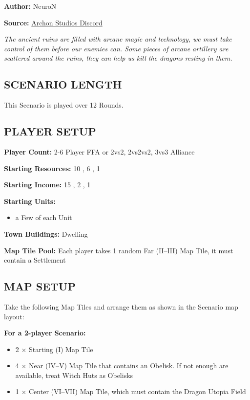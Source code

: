 
\begin{multicols}{2}

\textbf{Author:} NeuroN

\textbf{Source:} \href{https://discord.com/channels/740870068178649108/1279029213839626313}{Archon Studios Discord}

\textit{The ancient ruins are filled with arcane magic and technology, we must take control of them before our enemies can.
Some pieces of arcane artillery are scattered around the ruins, they can help us kill the dragons resting in them.}

\subsection*{\MakeUppercase{Scenario Length}}
This Scenario is played over 12 Rounds.

\subsection*{\MakeUppercase{Player Setup}}
\textbf{Player Count:} 2-6 Player FFA or 2vs2, 2vs2vs2, 3vs3 Alliance

\textbf{Starting Resources:} 10 , 6 , 1 

\textbf{Starting Income:} 15 , 2 , 1 

\textbf{Starting Units:}
\begin{itemize}
  \item a Few of each  Unit
\end{itemize}

\textbf{Town Buildings:}  Dwelling

\textbf{Map Tile Pool:} Each player takes 1 random Far (II--III) Map Tile, it must contain a Settlement

\subsection*{\MakeUppercase{Map Setup}}
Take the following Map Tiles and arrange them as shown in the Scenario map layout:

\textbf{For a 2-player Scenario:}
\begin{itemize}
  \item 2 × Starting (I) Map Tile
  \item 4 × Near (IV--V) Map Tile that contains an Obelisk. If not enough are available, treat Witch Huts as Obelisks
  \item 1 × Center (VI--VII) Map Tile, which must contain the Dragon Utopia Field
\end{itemize}


\end{multicols}
